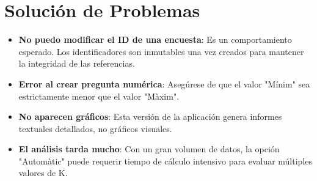\documentclass[a4paper,12pt]{article}
\begin{document}
\section{Solución de Problemas}
\begin{itemize}
    \item \textbf{No puedo modificar el ID de una encuesta}: Es un comportamiento esperado. Los identificadores son inmutables una vez creados para mantener la integridad de las referencias.
    \item \textbf{Error al crear pregunta numérica}: Asegúrese de que el valor "Mínim" sea estrictamente menor que el valor "Màxim".
    \item \textbf{No aparecen gráficos}: Esta versión de la aplicación genera informes textuales detallados, no gráficos visuales.
    \item \textbf{El análisis tarda mucho}: Con un gran volumen de datos, la opción "Automàtic" puede requerir tiempo de cálculo intensivo para evaluar múltiples valores de K.
\end{itemize}
\end{document}
